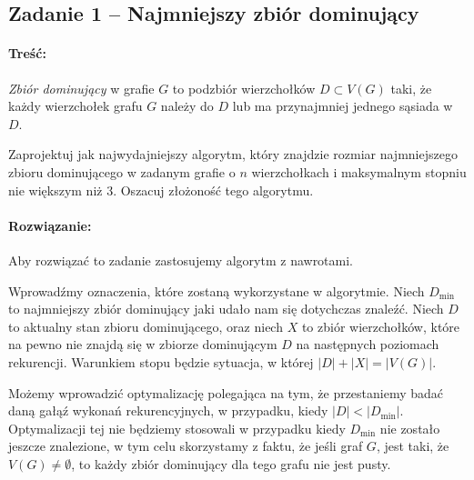 \subsection{Zadanie 1 -- Najmniejszy zbiór dominujący}
\paragraph{Treść:}
\textit{Zbiór dominujący} w grafie $G$ to podzbiór wierzchołków 
$D \subset V(G)$ taki, że każdy wierzchołek grafu $G$
należy do $D$ lub ma przynajmniej jednego sąsiada w $D$.

Zaprojektuj jak najwydajniejszy algorytm, który znajdzie rozmiar najmniejszego zbioru dominującego w zadanym
grafie o $n$ wierzchołkach i maksymalnym stopniu nie większym niż 3. Oszacuj złożoność tego algorytmu.

\paragraph{Rozwiązanie:}
Aby rozwiązać to zadanie zastosujemy algorytm z nawrotami.

Wprowadźmy oznaczenia, które zostaną wykorzystane w algorytmie.
Niech $D_{\min}$ to najmniejszy zbiór dominujący jaki udało 
nam się dotychczas znaleźć.
Niech $D$ to aktualny stan zbioru dominującego, oraz
niech $X$ to zbiór wierzchołków, które na pewno nie znajdą się 
w zbiorze dominującym $D$ na następnych poziomach rekurencji.
Warunkiem stopu będzie sytuacja, w której $|D| + |X| = |V(G)|$.

Możemy wprowadzić optymalizację polegająca na tym, że 
przestaniemy badać daną gałąź wykonań rekurencyjnych,
w przypadku, kiedy $|D| < |D_{\min}|$. Optymalizacji tej nie będziemy
stosowali w przypadku kiedy $D_{\min}$ nie zostało jeszcze znalezione,
w tym celu skorzystamy z faktu, że jeśli graf $G$, jest 
taki, że $V(G) \not = \emptyset$,
to każdy zbiór dominujący dla tego grafu nie jest pusty.

